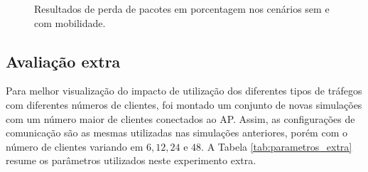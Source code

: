 \documentclass[12pt]{article}
\begin{document}
\begin{figure}[!ht]
	\centering
	\caption{Resultados de perda de pacotes em porcentagem nos cenários sem e com mobilidade.}
	\label{fig:perda_perc}
\end{figure}

\subsection{Avaliação extra}

Para melhor visualização do impacto de utilização dos diferentes tipos de tráfegos com diferentes números de clientes, foi montado um conjunto de novas simulações com um número maior de clientes conectados ao AP. Assim, as configurações de comunicação são as mesmas utilizadas nas simulações anteriores, porém com o número de clientes variando em $6, 12, 24$ e $48$. A Tabela \ref{tab:parametros_extra} resume os parâmetros utilizados neste experimento extra.
\end{document}

